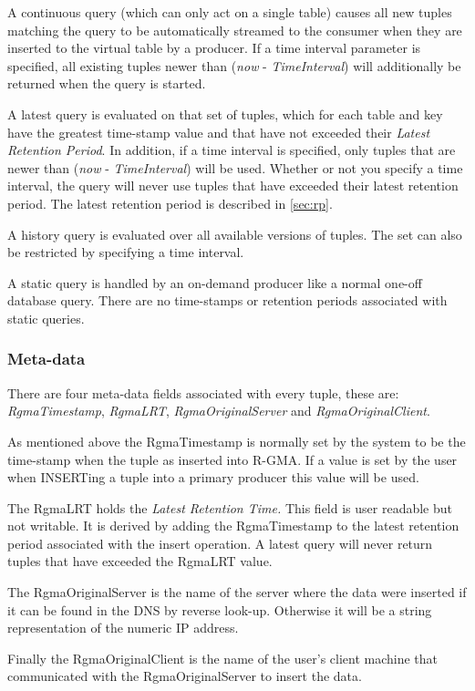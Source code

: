 A continuous query (which can only act on a single table) causes all
new tuples matching the query to be automatically streamed to the
consumer when they are inserted to the virtual table by a producer.
If a time interval parameter is specified, all existing tuples newer
than (\emph{now} - \emph{TimeInterval}) will additionally be returned
when the query is started.

A latest query is evaluated on that set of tuples, which for each
table and key have the greatest time-stamp value and that have not
exceeded their \emph{Latest Retention Period}. In addition, if a time
interval is specified, only tuples that are newer than (\emph{now} -
\emph{TimeInterval}) will be used. Whether or not you specify a time
interval, the query will never use tuples that have exceeded their
latest retention period. The latest retention period is described in
\ref{sec:rp}.

A history query is evaluated over all available versions of tuples.
The set can also be restricted by specifying a time interval.

A static query is handled by an on-demand producer like a normal
one-off database query. There are no time-stamps or retention periods
associated with static queries.

\subsubsection{Meta-data}
\label{sec:metadata}
There are four meta-data fields associated with every tuple, these
are: \textit{ RgmaTimestamp}, \textit{RgmaLRT},
\textit{RgmaOriginalServer} and \textit{RgmaOriginalClient}.

As mentioned above the RgmaTimestamp is normally set by the system to
be the time-stamp when the tuple as inserted into R-GMA. If a value is
set by the user when INSERTing a tuple into a primary producer this
value will be used.

The RgmaLRT holds the \textit{Latest Retention Time.} This field is
user readable but not writable. It is derived by adding the
RgmaTimestamp to the latest retention period associated with the
insert operation. A latest query will never return tuples that have
exceeded the RgmaLRT value.

The RgmaOriginalServer is the name of the server where the data were
inserted if it can be found in the DNS by reverse look-up. Otherwise
it will be a string representation of the numeric IP address.

Finally the RgmaOriginalClient is the name of the user's client
machine that communicated with the RgmaOriginalServer to insert the
data.

